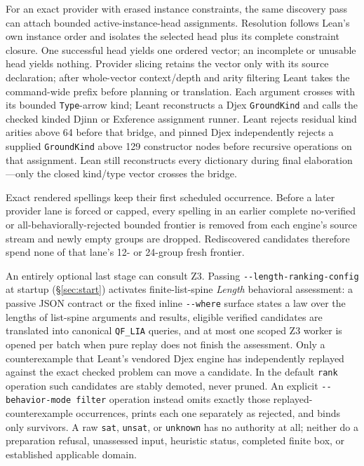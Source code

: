 \documentclass[11pt,oneside]{article}
\newcommand{\code}[1]{\texttt{#1}}
\begin{document}
For an exact provider with erased instance constraints, the same discovery
pass can attach bounded active-instance-head assignments. Resolution follows
Lean's own instance order and isolates the selected head plus its complete
constraint closure. One successful head yields one ordered vector; an
incomplete or unusable head yields nothing. Provider slicing retains the
vector only with its source declaration; after whole-vector context/depth and
arity filtering Leant takes the command-wide prefix before planning or
translation. Each argument crosses with its bounded \code{Type}-arrow kind;
Leant reconstructs a Djex \code{GroundKind} and calls the checked kinded Djinn
or Exference assignment runner. Leant rejects residual kind arities above 64
before that bridge, and pinned Djex independently rejects a supplied
\code{GroundKind} above 129 constructor nodes before recursive operations on
that assignment.
Lean still reconstructs every dictionary
during final elaboration---only the closed kind/type vector crosses the bridge.

Exact rendered spellings keep their first scheduled occurrence. Before a
later provider lane is forced or capped, every spelling in an earlier complete
no-verified or all-behaviorally-rejected bounded frontier is removed from each
engine's source stream and newly empty groups are dropped. Rediscovered
candidates therefore spend none of that lane's 12- or 24-group fresh frontier.

An entirely optional last stage can consult Z3.  Passing
\code{-{}-length-ranking-config} at startup (\S\ref{sec:start}) activates
finite-list-spine \emph{Length} behavioral assessment: a passive JSON contract
or the fixed inline \code{-{}-where} surface states a law over the lengths of list-spine arguments and
results, eligible verified candidates are translated into canonical
\code{QF\_LIA} queries, and at most one scoped Z3 worker is opened per
batch when pure replay does not finish the assessment. Only a counterexample
that Leant's vendored Djex engine has
independently replayed against the exact checked problem can move a
candidate. In the default \code{rank} operation such candidates are stably
demoted, never pruned. An explicit \code{-{}-behavior-mode filter} operation
instead omits exactly those replayed-counterexample occurrences, prints each
one separately as rejected, and binds only survivors. A raw \code{sat},
\code{unsat}, or \code{unknown} has no authority at all; neither do a
preparation refusal, unassessed input, heuristic status, completed finite box,
or established applicable domain.
\end{document}
